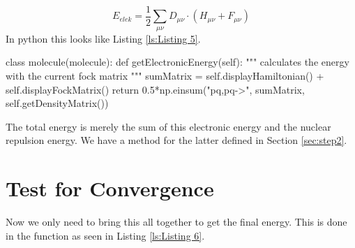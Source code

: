  \begin{equation} \label{eq:energy}
     E_{elek} = \frac{1}{2}\sum_{\mu\nu}D_{\mu\nu}\cdot(H_{\mu\nu} + F_{\mu\nu})
 \end{equation}
 In python this looks like Listing \ref{ls:Listing 5}.
 
 
    
\begin{python}[caption={calculating the energy},label={ls:Listing 5}]
    class molecule(molecule):
        def getElectronicEnergy(self):
            """
            calculates the energy with the current fock matrix
            """
            sumMatrix = self.displayHamiltonian() 
                    + self.displayFockMatrix()
            return 0.5*np.einsum("pq,pq->", sumMatrix, 
                            self.getDensityMatrix())
\end{python}

The total energy is merely the sum of this electronic energy and the nuclear 
repulsion energy. We have a method for the latter defined in Section 
\ref{sec:step2}.
 
 \section{Test for Convergence}
 \label{sec:step6}
Now we only need to bring this all together to get the final energy. 
This is done in the function  as seen in Listing 
\ref{ls:Listing 6}.

 
   
